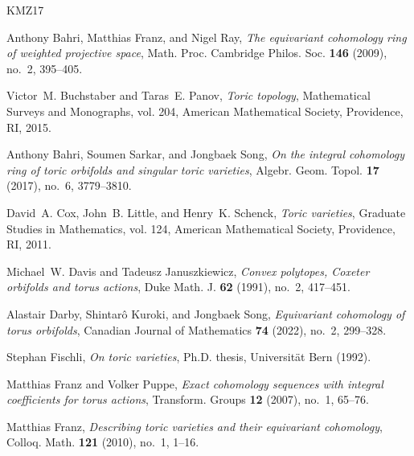\documentclass[10pt]{amsart}
\theoremstyle{plain}
\theoremstyle{definition}
\numberwithin{equation}{section}
\begin{document}
%
%
%
%


\providecommand{\href}[2]{#2}
\begin{thebibliography}{KMZ17}

Anthony Bahri, Matthias Franz, and Nigel Ray, \emph{The equivariant cohomology ring of weighted projective space}, Math. Proc. Cambridge Philos. Soc.  \textbf{146} (2009), no.~2, 395--405. 

Victor~M. Buchstaber and Taras~E. Panov, \emph{Toric topology}, Mathematical  Surveys and Monographs, vol. 204, American Mathematical Society, Providence,  RI, 2015. 

Anthony Bahri, Soumen Sarkar, and Jongbaek Song, \emph{On the integral cohomology ring of toric orbifolds and singular toric varieties}, Algebr.  Geom. Topol. \textbf{17} (2017), no.~6, 3779--3810. 

David~A. Cox, John~B. Little, and Henry~K. Schenck, \emph{Toric varieties},
  Graduate Studies in Mathematics, vol. 124, American Mathematical Society,
  Providence, RI, 2011.

Michael~W. Davis and Tadeusz Januszkiewicz, \emph{Convex polytopes, {C}oxeter orbifolds and torus actions}, Duke Math. J. \textbf{62} (1991), no.~2,  417--451.

Alastair Darby, Shintar{\^o} Kuroki, and Jongbaek Song, \emph{Equivariant cohomology of torus orbifolds}, Canadian Journal of Mathematics \textbf{74} (2022), no.~2, 299--328.

Stephan Fischli, \emph{On toric varieties}, Ph.D. thesis, Universit{\"a}t Bern (1992).

Matthias Franz and Volker Puppe, \emph{Exact cohomology sequences with integral
  coefficients for torus actions}, Transform. Groups \textbf{12} (2007), no.~1,
  65--76. 

Matthias Franz, \emph{Describing toric varieties and their equivariant cohomology}, Colloq. Math. \textbf{121} (2010), no.~1, 1--16. 


\end{thebibliography}
\end{document}
